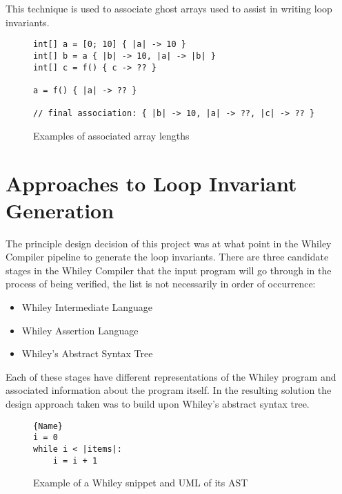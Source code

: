 This technique is used to associate ghost arrays used to assist in writing
loop invariants.

\begin{figure}[ht]
\begin{lstlisting}
int[] a = [0; 10] { |a| -> 10 }
int[] b = a { |b| -> 10, |a| -> |b| }
int[] c = f() { c -> ?? }

a = f() { |a| -> ?? }

// final association: { |b| -> 10, |a| -> ??, |c| -> ?? }
\end{lstlisting}
\caption{Examples of associated array lengths}
\label{lst:simple-mutations}
\end{figure}


\section{Approaches to Loop Invariant Generation}

The principle design decision of this project was at
what point in the Whiley Compiler pipeline
to generate the loop invariants.
There are three candidate stages in the Whiley Compiler
that the input program will go through in the process of
being verified, the list is not necessarily in order of occurrence:

\begin{itemize}
    \item{Whiley Intermediate Language}
    \item{Whiley Assertion Language}
    \item{Whiley's Abstract Syntax Tree}
\end{itemize}

Each of these stages have different representations of the Whiley program and
associated information about the program itself.
In the resulting solution the design approach taken was to build upon
Whiley's abstract syntax tree.


\begin{figure}
\noindent\begin{minipage}{.45\textwidth}
\begin{lstlisting}[caption={Whiley Code},frame=tlrb,numbers=none]{Name}
i = 0
while i < |items|:
    i = i + 1
\end{lstlisting}
\end{minipage}\hfill
\begin{minipage}{.45\textwidth}
\end{minipage}
\caption{Example of a Whiley snippet and UML of its AST}
\label{lst:design-whiley}
\end{figure}

